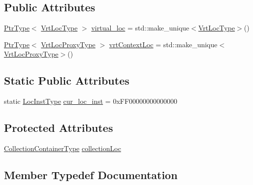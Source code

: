 \subsection*{Public Attributes}
\begin{DoxyCompactItemize}
\item 
\hyperlink{structvt_1_1location_1_1_location_manager_a32d8bca6ed6909a2190286408335d3b4}{Ptr\+Type}$<$ \hyperlink{structvt_1_1location_1_1_location_manager_a06ec1698d93780afdf7873eeaa3a77b6}{Vrt\+Loc\+Type} $>$ \hyperlink{structvt_1_1location_1_1_location_manager_af8cbcba6c30a17a56d69fcf48007cdad}{virtual\+\_\+loc} = std\+::make\+\_\+unique$<$\hyperlink{structvt_1_1location_1_1_location_manager_a06ec1698d93780afdf7873eeaa3a77b6}{Vrt\+Loc\+Type}$>$()
\item 
\hyperlink{structvt_1_1location_1_1_location_manager_a32d8bca6ed6909a2190286408335d3b4}{Ptr\+Type}$<$ \hyperlink{structvt_1_1location_1_1_location_manager_a3e410c85f5790a526a4eda22a9cc7881}{Vrt\+Loc\+Proxy\+Type} $>$ \hyperlink{structvt_1_1location_1_1_location_manager_aec12685db3f4c7c9fec6348496689174}{vrt\+Context\+Loc} = std\+::make\+\_\+unique$<$\hyperlink{structvt_1_1location_1_1_location_manager_a3e410c85f5790a526a4eda22a9cc7881}{Vrt\+Loc\+Proxy\+Type}$>$()
\end{DoxyCompactItemize}
\subsection*{Static Public Attributes}
\begin{DoxyCompactItemize}
\item 
static \hyperlink{namespacevt_1_1location_a4db6456e8024af2d23fc5ae560fef866}{Loc\+Inst\+Type} \hyperlink{structvt_1_1location_1_1_location_manager_a644b4b030fd616375728316281295250}{cur\+\_\+loc\+\_\+inst} = 0x\+F\+F00000000000000
\end{DoxyCompactItemize}
\subsection*{Protected Attributes}
\begin{DoxyCompactItemize}
\item 
\hyperlink{structvt_1_1location_1_1_location_manager_a03472723aecf57cd99cd221ef2164edb}{Collection\+Container\+Type} \hyperlink{structvt_1_1location_1_1_location_manager_a748aa3659f6aee39fb0936e694aa74ac}{collection\+Loc}
\end{DoxyCompactItemize}


\subsection{Member Typedef Documentation}
\mbox{\label{structvt_1_1location_1_1_location_manager_a6de3841092c537efc5fb8376128bfe18}} 

